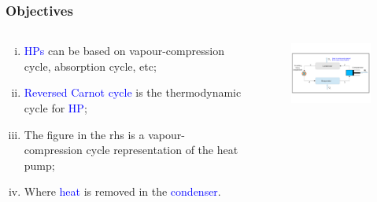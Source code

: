 \documentclass[10pt,compress,handout,ignorenonframetext]{beamer}
\begin{document}
\begin{frame}
 \frametitle{Objectives}
  \begin{columns}
   \begin{column}[c]{0.45\linewidth}
  \begin{enumerate}[(i)]
   \item <1-> \textcolor{blue}{HPs} can be based on vapour-compression cycle, absorption cycle, etc;
   \item <2-> \textcolor{blue}{Reversed Carnot cycle} is the thermodynamic cycle for \textcolor{blue}{HP};
   \item <3-> The figure in the rhs is a vapour-compression cycle representation of the heat pump;
   \item <4-> Where \textcolor{blue}{heat} is removed in the \textcolor{blue}{condenser}.
  \end{enumerate}
   \end{column}
   \begin{column}[c]{0.55\linewidth}\vspace{-1.cm}
    \begin{figure}%
     \begin{center}
      \includegraphics[width=6.5cm,clip]{./Pics/Overview_Refrig36}
     \end{center}
    \end{figure}  
   \end{column}  
  \end{columns}
\end{frame}
\end{document}
